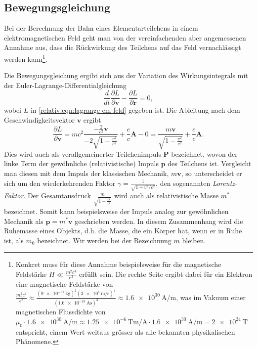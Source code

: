 \subsection{Bewegungsgleichung
\label{relativ:section:bewegungsgleichung}}

Bei der Berechnung der Bahn eines Elementarteilchens
in einem elektromagnetischen Feld geht man von
der vereinfachenden aber angemessenen Annahme aus,
dass die Rückwirkung des Teilchens auf das Feld vernachlässigt werden kann\footnote{
Konkret muss für diese Annahme beispielsweise
für die magnetische Feldstärke
\(H \ll \frac{m^2c^4}{e^3}\) erfüllt sein.
Die rechte Seite ergibt dabei für ein Elektron
eine magnetische Feldstärke von
\(\frac{m_e^2c^4}{e^3} \approx
\frac{(\qty{9e-31}{\kilogram})^2 (\qty{3e8}{\metre\per\second})^4}{(\qty{1.6e-19}{\ampere\second})^3}
\approx \qty[per-mode=fraction]{1.6e30}{\ampere\per\metre}\),
was im Vakuum einer magnetischen Flussdichte von
\(\mu_0 \cdot \qty[per-mode=fraction]{1.6e30}{\ampere\per\metre} \approx
\qty[per-mode=fraction]{1.25e-6}{\tesla\metre\per\ampere} \cdot
\qty[per-mode=fraction]{1.6e30}{\ampere\per\metre} =
\qty{2e24}{\tesla}\)
entspricht, einem Wert weitaus grösser als alle bekannten physikalischen Phänomene.}.

Die Bewegungsgleichung ergibt sich aus der Variation des Wirkungsintegrals
mit der Euler-Lagrange-Differentialgleichung
\begin{equation}
    \frac{d}{dt} \frac{\partial L}{\partial \bm{v}} - \frac{\partial L}{\partial \bm{r}} = 0,
    \label{relativ:eqn:euler-lagrange-em-feld}
\end{equation}
wobei \(L\) in \eqref{relativ:eqn:lagrange-em-feld} gegeben ist.
Die Ableitung nach dem Geschwindigkeitsvektor \(\bm{v}\) ergibt
\begin{equation}
    \frac{\partial L}{\partial \bm{v}} =
    mc^2 \frac{-\frac{2}{c^2}\bm{v}}{-2\sqrt{1-\frac{v^2}{c^2}}}
    + \frac{e}{c} \bm{A} - 0
    = \frac{m \bm{v}}{\sqrt{1-\frac{v^2}{c^2}}} + \frac{e}{c} \bm{A}.
    \label{relativ:eqn:part-diff-v}
\end{equation}
Dies wird auch als verallgemeinerter Teilchenimpuls \(\bm{P}\) bezeichnet,
wovon der linke Term der gewöhnliche (relativistische) Impuls \(\bm{p}\)
des Teilchens ist.
Vergleicht man diesen mit dem Impuls der klassischen Mechanik, \(m\bm{v}\),
so unterscheidet er sich um den wiederkehrenden Faktor
\(\gamma=\frac{1}{\sqrt{1-v^2/c^2}}\), den sogenannten \emph{Lorentz-Faktor}.
Der Gesamtausdruck \(\frac{m}{\sqrt{1-\frac{v^2}{c^2}}}\) wird auch als
relativistische Masse \(m^*\) bezeichnet. Somit kann beispielsweise der
Impuls analog zur gewöhnlichen Mechanik als
\(\bm{p}=m^*\bm{v}\) geschrieben werden.
In diesem Zusammenhang wird die Ruhemasse eines Objekts, d.h.
die Masse, die ein Körper hat, wenn er in Ruhe ist,
als \(m_0\) bezeichnet.
Wir werden bei der Bezeichnung \(m\) bleiben.

